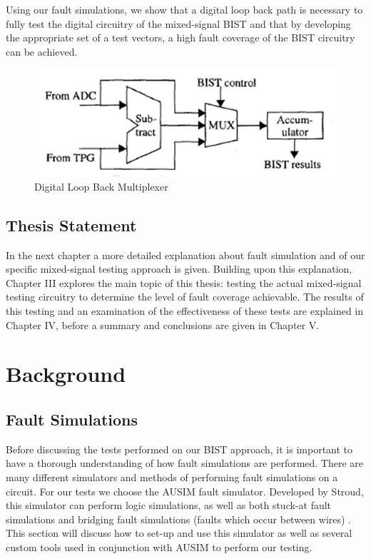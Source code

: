 \documentclass[12pt]{report}
\begin{document}
Using our fault simulations, we show that a digital loop back path is necessary to fully test the digital circuitry of the mixed-signal BIST and that by developing the appropriate set of a test vectors, a high fault coverage of the BIST circuitry can be achieved.
\begin{figure}
	\begin{center}
		\includegraphics[scale=.7]{images/digital-loopback}
	\end{center}
	\caption{Digital Loop Back Multiplexer\cite{stroud}}
	\label{fig:digital-loopback}
\end{figure}

\section{Thesis Statement}
In the next chapter a more detailed explanation about fault simulation and of our specific mixed-signal testing approach is given.  Building upon this explanation, Chapter III explores the main topic of this thesis: testing the actual mixed-signal testing circuitry to determine the level of fault coverage achievable.  The results of this testing and an examination of the effectiveness of these tests are explained in Chapter IV, before a summary and conclusions are given in Chapter V.

\chapter{Background}

\section{Fault Simulations}
Before discussing the tests performed on our BIST approach, it is important to have a thorough understanding of how fault simulations are performed.  There are many different simulators and methods of performing fault simulations on a circuit.  For our tests we choose the AUSIM fault simulator.  Developed by Stroud, this simulator can perform logic simulations, as well as both stuck-at fault simulations and bridging fault simulations (faults which occur between wires) \cite{ausim}.  This section will discuss how to set-up and use this simulator as well as several custom tools used in conjunction with AUSIM to perform our testing.
\end{document}
